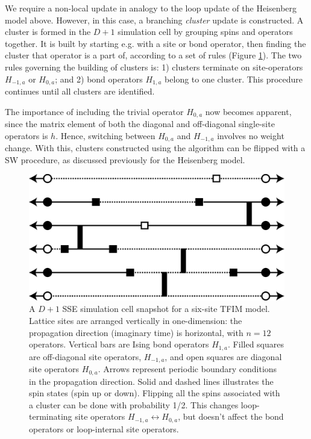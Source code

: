 \documentclass[vecphys]{svmult}
\begin{document}
We require a non-local update in analogy to the loop update of the Heisenberg model above.  However, in this case, a branching {\it cluster} update is constructed.  A cluster is formed in the $D+1$ simulation cell by grouping spins and operators together.  It is built by starting e.g. with a site or bond operator, then finding the cluster that operator is a part of, according to a set of rules (Figure \ref{Melko:fig:4}).  The two rules governing the building of clusters is: 1) clusters terminate on site-operators $H_{-1,a}$ or $H_{0,a}$; and 2) bond operators $H_{1,a}$ belong to one cluster. This procedure continues until all clusters are identified.

The importance of including the trivial operator $H_{0,a}$ now becomes apparent, since the matrix element of both the diagonal and off-diagonal single-site operators is $h$.  Hence, switching between $H_{0,a}$ and $H_{-1,a}$ involves no weight change.  With this, clusters constructed using the algorithm can be flipped with a SW procedure, as discussed previously for the Heisenberg model.  

\begin{figure}[t]
\centering
\includegraphics*[width=.9\textwidth]{finiteT_tfim.eps}
\caption[]{A $D+1$ SSE simulation cell snapshot for a six-site TFIM model.  Lattice sites are arranged vertically in one-dimension: the propagation direction (imaginary time) is horizontal, with $n=12$ operators.  
Vertical bars are Ising bond operators $H_{1,a}$.  Filled squares are off-diagonal site operators, $H_{-1,a}$, and open squares are diagonal site operators $H_{0,a}$.
Arrows represent periodic boundary conditions in the propagation direction.  
Solid and dashed lines illustrates the spin states (spin up or down).  Flipping all the spins associated with a cluster can be done with probability 1/2.  This changes loop-terminating site operators $H_{-1,a} \leftrightarrow H_{0,a}$, but doesn't affect the bond operators or loop-internal site operators.}
\label{Melko:fig:4}      
\end{figure} 
\end{document}
